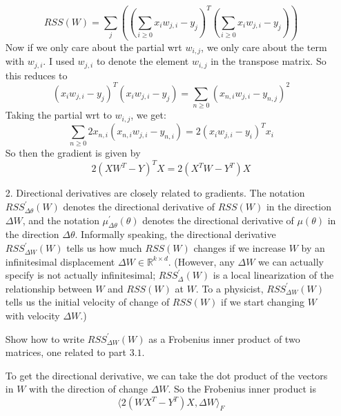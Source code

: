 \documentclass{article}
\begin{document}
\begin{itemize}
\begin{answer}
                    \begin{equation*}
                        RSS(W) = \sum_{j} \left(\left(\sum_{i \geq 0} x_{i}w_{j, i} - y_{j}\right)^{T}\left(\sum_{i \geq 0} x_{i} w_{j, i} - y_{j}\right)\right)
                    \end{equation*}
                Now if we only care about the partial wrt $w_{i, j}$, we only care about the term with $w_{j, i}$. I used $w_{j, i}$ to denote the element $w_{i, j}$ in the transpose matrix. So this reduces to
                    \begin{equation*}
                        (x_{i}w_{j, i} - y_{j})^{T}(x_{i}w_{j, i} - y_{j}) = \sum_{n \geq 0} (x_{n, i}w_{j, i} - y_{n, j})^{2}
                    \end{equation*}
                Taking the partial wrt to $w_{i, j}$, we get:
                    \begin{equation*}
                        \sum_{n \geq 0} 2x_{n, i}(x_{n, i}w_{j, i} - y_{n, i}) = 2(x_{i}w_{j, i} - y_{i})^{T}x_{i}
                    \end{equation*}
                So then the gradient is given by
                    \begin{equation*}
                        2(XW^{T} - Y)^{T}X = 2(X^{T}W - Y^{T})X
                    \end{equation*}
            \end{answer}

        \item [2.] Directional derivatives are closely related to gradients. The notation $RSS^{\prime}_{\Delta \theta}(W)$ denotes the directional derivative of $RSS(W)$ in the direction $\Delta W$, and the notation $\mu^{\prime}_{\Delta\theta}(\theta)$ denotes the directional derivative of $\mu(\theta)$ in the direction $\Delta\theta$. Informally speaking, the directional derivative $RSS^{\prime}_{\Delta W}(W)$ tells us how much $RSS(W)$ changes if we increase $W$ by an infinitesimal displacement $\Delta W \in \mathbb{R}^{k \times d}$. (However, any $\Delta W$ we can actually specify is not actually infinitesimal; $RSS^{\prime}_{\Delta}(W)$ is a local linearization of the relationship between $W$ and $RSS(W)$ at $W$. To a physicist, $RSS^{\prime}_{\Delta W}(W)$ tells us the initial velocity of change of $RSS(W)$ if we start changing $W$ with velocity $\Delta W$.)

        Show how to write $RSS^{\prime}_{\Delta W}(W)$ as a Frobenius inner product of two matrices, one related to part $3.1$.
            \begin{answer}
                To get the directional derivative, we can take the dot product of the vectors in $W$ with the direction of change $\Delta W$. So the Frobenius inner product is
                    \begin{equation*}
                        \langle 2(WX^{T} - Y^{T})X, \Delta W \rangle_{F}
                    \end{equation*}
            \end{answer}


\end{itemize}
\end{document}
